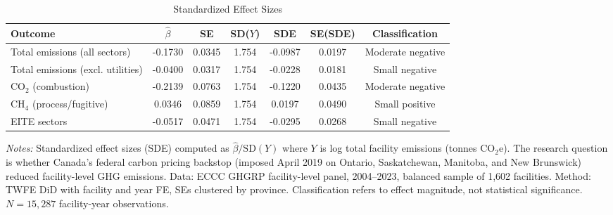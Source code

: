 \begin{table}[htbp]
\centering
\caption{Standardized Effect Sizes}
\label{tab:sde}
\begin{adjustbox}{max width=\textwidth}
\begin{tabular}{lcccccc}
\hline\hline
Outcome & $\hat{\beta}$ & SE & SD($Y$) & SDE & SE(SDE) & Classification \\
\hline
Total emissions (all sectors) & -0.1730 & 0.0345 & 1.754 & -0.0987 & 0.0197 & Moderate negative \\
Total emissions (excl. utilities) & -0.0400 & 0.0317 & 1.754 & -0.0228 & 0.0181 & Small negative \\
CO$_2$ (combustion) & -0.2139 & 0.0763 & 1.754 & -0.1220 & 0.0435 & Moderate negative \\
CH$_4$ (process/fugitive) & 0.0346 & 0.0859 & 1.754 & 0.0197 & 0.0490 & Small positive \\
EITE sectors & -0.0517 & 0.0471 & 1.754 & -0.0295 & 0.0268 & Small negative \\
\hline\hline
\end{tabular}
\end{adjustbox}
\begin{tablenotes}
\small
\item \textit{Notes:} Standardized effect sizes (SDE) computed as $\hat{\beta} / \text{SD}(Y)$ where $Y$ is log total facility emissions (tonnes CO$_2$e). The research question is whether Canada's federal carbon pricing backstop (imposed April 2019 on Ontario, Saskatchewan, Manitoba, and New Brunswick) reduced facility-level GHG emissions. Data: ECCC GHGRP facility-level panel, 2004--2023, balanced sample of 1,602 facilities. Method: TWFE DiD with facility and year FE, SEs clustered by province. Classification refers to effect magnitude, not statistical significance. $N = 15{,}287$ facility-year observations.
\end{tablenotes}
\end{table}
